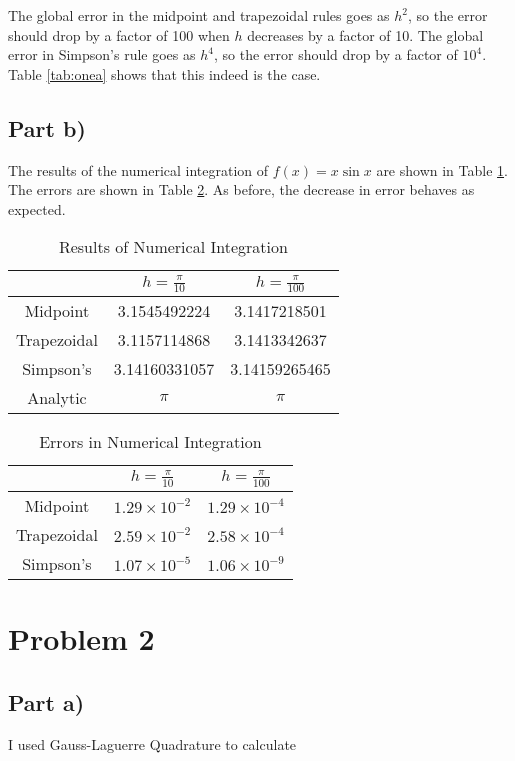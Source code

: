 \documentclass[11pt,letterpaper]{article}
\begin{document}
The global error in the midpoint and trapezoidal rules goes as $h^2$, so 
the error should drop by a factor of 100 when $h$ decreases by a 
factor of 10.  The global error in Simpson's rule goes as $h^4$, 
so the error should drop by a factor of $10^4$.  Table \ref{tab:onea} 
shows that this indeed is the case.

\subsection{Part b)}
The results of the numerical integration of $f(x)=x\sin{x}$ are 
shown in Table \ref{tab:oneb}.  The errors are shown in Table 
\ref{tab:oneb2}.  As before, the decrease in error behaves as expected.  

\begin{table}[!h]
\centering
\caption{Results of Numerical Integration}
\begin{tabular}{c|c|c}
\hline
 & $h=\frac{\pi}{10}$ & $h=\frac{\pi}{100}$\\
\hline
Midpoint & 3.1545492224 & 3.1417218501\\
Trapezoidal & 3.1157114868 & 3.1413342637\\
Simpson's & 3.14160331057 & 3.14159265465\\
Analytic & $\pi$ & $\pi$\\
\hline
\end{tabular}
\label{tab:oneb}
\end{table}

\begin{table}[!h]
\centering
\caption{Errors in Numerical Integration}
\begin{tabular}{c|c|c}
\hline
 & $h=\frac{\pi}{10}$ & $h=\frac{\pi}{100}$\\
\hline
Midpoint & $1.29\times10^{-2}$ & $1.29\times10^{-4}$\\
Trapezoidal & $2.59\times10^{-2}$ & $2.58\times10^{-4}$\\
Simpson's & $1.07\times10^{-5}$ & $1.06\times10^{-9}$\\
\hline
\end{tabular}
\label{tab:oneb2}
\end{table}

\section{Problem 2}
\subsection{Part a)}
I used Gauss-Laguerre Quadrature to calculate 
\end{document}
